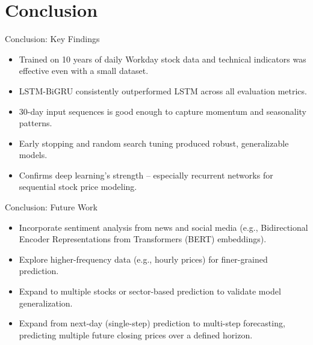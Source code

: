 \section{Conclusion}

\begin{frame}[shrink]{Conclusion: Key Findings}

\begin{itemize}
    \item Trained on \alert{10 years of daily Workday stock data} and technical
    indicators was effective even with a small dataset.
    \item \alert{LSTM-BiGRU consistently outperformed LSTM} across all evaluation
    metrics.
    \item \alert{30-day input sequences} is good enough to
        capture momentum and seasonality patterns.
    \item Early stopping and random search tuning produced robust, generalizable models.
    \item \alert{Confirms deep learning’s strength} -- especially recurrent networks for 
        sequential stock price modeling.
\end{itemize}

\end{frame}

\begin{frame}[shrink]{Conclusion: Future Work}

\begin{itemize}
    \item Incorporate \alert{sentiment analysis} from news and social media (e.g., Bidirectional Encoder Representations from Transformers (BERT) embeddings).
    \item Explore \alert{higher-frequency data} (e.g., hourly prices) for finer-grained prediction.
    \item Expand to multiple stocks or sector-based prediction to validate model generalization.
    \item \alert{Expand from next-day (single-step) prediction to multi-step forecasting}, 
    predicting multiple future closing prices over a defined horizon.
\end{itemize}

\end{frame}
